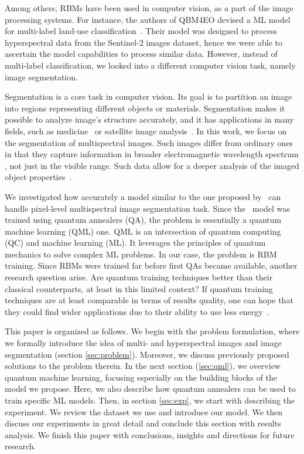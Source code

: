 \documentclass[runningheads]{llncs}
\begin{document}
Among others, RBMs have been used in computer vision, as a part of the
image processing systems. For instance, the authors of QBM4EO devised a
ML model for multi-label land-use classification~\cite{QBM4EO}. Their model
was designed to process hyperspectral data from the Sentinel-2 images dataset,
hence we were able to ascertain the model capabilities to process similar data.
However, instead of multi-label classification, we looked into a different
computer vision task, namely image segmentation.

Segmentation is a core task in computer vision. Its goal is to partition an
image into regions representing different objects or materials. Segmentation
makes it possible to analyze image's structure accurately, and it has
applications in many fields, such as medicine~\cite{Wang2022} or satellite
image analysis~\cite{fajtl2020}. In this work, we focus on the segmentation of
multispectral images. Such images differ from ordinary ones in that they
capture information in broader electromagnetic wavelength spectrum %
, not just in the visible range. Such data allow for a deeper
analysis of the imaged object properties~\cite{Sifnaios2024}. 

We investigated how accurately a model similar to the one
proposed by~\cite{QBM4EO} can handle pixel-level multispectral image
segmentation task. Since the~\cite{QBM4EO} model was trained using quantum
annealers (QA), the problem is essentially a quantum machine learning (QML) one.
QML is an intersection of quantum computing (QC) and machine learning (ML). It
leverages the principles of quantum mechanics to solve complex ML problems. In
our case, the problem is RBM training. Since RBMs were trained far before first
QAs became available, another research question arise. Are quantum training
techniques better than their classical counterparts, at least in this limited
context? If quantum training techniques are at least comparable in terms of
results quality, one can hope that they could find wider applications due to
their ability to use less energy~\cite{Jaschke_Montangero_2023, kasi2022costpowerfeasibilityanalysis}. 

This paper is organized as follows. We begin with the problem formulation, where
we formally introduce the idea of multi- and hyperspectral images and image
segmentation (section \ref{sec:problem}). Moreover, we discuss previously proposed solutions to the problem
therein. In the next section (\ref{sec:qml}), we overview quantum machine learning, focusing
especially on the building blocks of the model we propose. Here, we also
describe how quantum annealers can be used to train specific ML models. Then, in section \ref{sec:exp}, we
start with describing the experiment. We review the dataset we use and introduce
our model. We then discuss our experiments in great detail and conclude this
section with results analysis. We finish this paper with conclusions, insights
and directions for future research.
\end{document}
